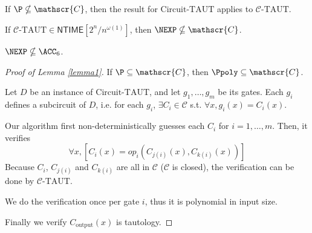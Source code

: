 \documentclass[letterpaper, 12pt]{article}
\newcommand{\NTime}[1]{\mathsf{NTIME}[#1]}
\newcommand{\ctaut}{\textrm{Circuit-TAUT}}
\newcommand{\taut}{\textrm{-TAUT}}
\begin{document}
If $\P \nsubseteq \mathscr{C}$, then the result for $\ctaut$ applies to $\mathscr{C}\taut$.

\begin{corollary}
	If $\mathscr{C}\taut \in \NTime{2^n/n^{\omega(1)}}$, then $\NEXP \nsubseteq \mathscr{C}$.
\end{corollary}

\begin{corollary}
	$\NEXP \nsubseteq \ACC_6$.
\end{corollary}

\begin{proof}[Proof of Lemma \ref{lemma1}]
	If $\P \subseteq \mathscr{C}$, then $\Ppoly \subseteq \mathscr{C}$.
	
	Let $D$ be an instance of $\ctaut$, and let $g_1, \dots , g_m$ be its gates. Each $g_i$ defines a subcircuit of $D$, i.e. for each $g_i$, $\exists C_i \in \mathscr{C}$ s.t. $\forall x, g_i(x) = C_i(x)$.
	
	Our algorithm first non-deterministically guesses each $C_i$ for $i = 1, \dots , m$. Then, it verifies
	\[\forall x, \left[C_i(x) = op_i(C_{j(i)}(x),C_{k(i)}(x) )\right]\]
	Because $C_i$, $C_{j(i)}$ and $C_{k(i)}$ are all in $\mathscr{C}$ ($\mathscr{C}$ is closed), the verification can be done by $\mathscr{C}\taut$.
	
	We do the verification once per gate $i$, thus it is polynomial in input size.
	
	Finally we verify $C_{\text{output}}(x)$ is tautology.
\end{proof}
\end{document}
